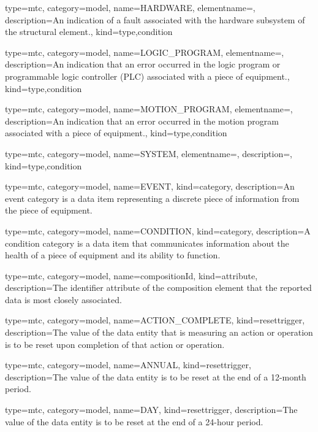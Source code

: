 {
  type=mtc,
  category=model,
  name={HARDWARE},
  elementname=,
  description={An indication of a fault associated with the hardware subsystem of the \gls{structural element}.},
  kind={type,condition}
}


{
  type=mtc,
  category=model,
  name={LOGIC\_PROGRAM},
  elementname=,
  description={An indication that an error occurred in the logic program or programmable logic controller (PLC) associated with a piece of equipment.},
  kind={type,condition}
}


{
  type=mtc,
  category=model,
  name={MOTION\_PROGRAM},
  elementname=,
  description={An indication that an error occurred in the motion program associated with a piece of equipment.},
  kind={type,condition}
}


{
  type=mtc,
  category=model,
  name={SYSTEM},
  elementname=,
  description={},
  kind={type,condition}
}


{
  type=mtc,
  category=model,
  name={EVENT},
  kind={category},
  description={An \gls{event category} is a data item representing a discrete piece of information from the piece of equipment. }
}


{
  type=mtc,
  category=model,
  name={CONDITION},
  kind={category},
  description={A \gls{condition category} is a data item that communicates information about the health of a piece of equipment and its ability to function. }
}


{
  type=mtc,
  category=model,
  name={compositionId},
  kind={attribute},
  description={The identifier attribute of the \gls{composition} element that the reported data is most closely associated. }
}


{
  type=mtc,
  category=model,
  name={ACTION\_COMPLETE},
  kind={resettrigger},
  description={The value of the \gls{data entity} that is measuring an action or operation is to be reset upon completion of that action or operation.}
}


{
  type=mtc,
  category=model,
  name={ANNUAL},
  kind={resettrigger},
  description={The value of the \gls{data entity} is to be reset at the end of a 12-month period.}
}


{
  type=mtc,
  category=model,
  name={DAY},
  kind={resettrigger},
  description={The value of the \gls{data entity} is to be reset at the end of a 24-hour period.}
}


